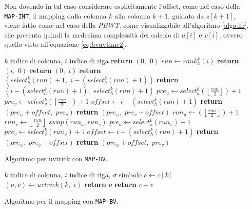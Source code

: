 Non dovendo in tal
caso considerare esplicitamente l'offset, come nel caso della \texttt{MAP-INT},
il mapping dalla colonna $k$ alla 
colonna $k+1$, guidato da $z[k+1]$, viene fatto come nel caso della
\textit{PBWT}, come visualizzabile all'algoritmo \ref{algo:lfr}, che presenta
quindi la medesima complessità del calcolo di $u[i]$ e $v[i]$, ovvero quello
visto all'equazione \ref{eq:bvuvtime2}.
\begin{algorithm}
  \begin{algorithmic}[1]
    \Comment $k$ indice di colonna, $i$ indice di riga
    \State \textbf{return} $(0,\,\,0)$
    \EndIf
    \State $run \gets rank_h^{k}(i)$
    \State \textbf{return} $(i,\,\, 0)$
    \Else
    \State \textbf{return} $(0, \,\,i)$
    \EndIf
    \State \textbf{return} $(select_h^{k}(run)+1,\,\, i-(select_h^{k}(run)+1))$
    \Else
    \State \textbf{return} $(i-(select_h^{k}(run)+1),\,\, select_h^{k}(run)+1)$
    \EndIf
    \Else
    \State $pre_u\gets
    select_u^{k}\left(\left\lfloor\frac{run}{2}\right\rfloor\right)+1$ 
    \State $pre_v\gets
    select_v^{k}\left(\left\lfloor\frac{run}{2}\right\rfloor\right)+1$ 
    \State $offset \gets i -(select_h^{k}(run)+1)$
    \State \textbf{return} $(pre_u+offset,\,\, pre_v)$
    \Else
    \State \textbf{return} $(pre_u, \,\,pre_v+offset)$
    \EndIf
    \Else
    \State $run_u\gets \left(\left\lfloor\frac{run}{2}\right\rfloor\right)+1$
    \State $run_v\gets \left\lfloor\frac{run}{2}\right\rfloor$
    \State $swap(run_u, run_v)$
    \EndIf
    \State $pre_u\gets select_u^{k}(run_u)+1$
    \State $pre_v\gets select_v^{k}(run_v)+1$
    \State $offset \gets i -(select_h^{k}(run)+1)$
    \State \textbf{return} $(pre_u, \,\,pre_v+offset)$
    \Else
    \State \textbf{return} $(pre_u+offset, \,\,pre_v)$
    \EndIf
    \EndIf
    \EndIf
    \EndFunction
  \end{algorithmic}
  \caption{Algoritmo per uvtrick con \texttt{MAP-BV}.}
  \label{algo:uvbv}
\end{algorithm}
\begin{algorithm}
  \begin{algorithmic}[1]
    \Comment $k$ indice di colonna, $i$ indice di riga, $\sigma$ simbolo
    \State $c\gets c[k]$
    \State $(u, v) \gets uvtrick(k,\,\,i)$
    \State \textbf{return} $u$
    \Else
    \State \textbf{return} $c+v$
    \EndIf
    \EndFunction
  \end{algorithmic}
  \caption{Algoritmo per il mapping con \texttt{MAP-BV}.}
  \label{algo:lfr}
\end{algorithm}
